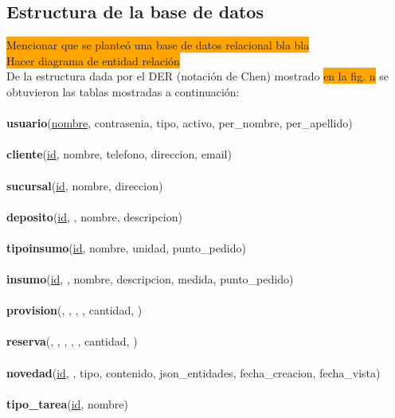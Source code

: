 \documentclass[a4paper, 12pt,twoside]{report}  %
\numberwithin{equation}{subsection} %
\begin{document}
\subsection{Estructura de la base de datos}
\colorbox{orange}{Mencionar que se planteó una base de datos relacional bla bla}\\
\colorbox{orange}{Hacer diagrama de entidad relación}\\
De la estructura dada por el DER (notación de Chen) mostrado \colorbox{orange}{en la fig. n} se obtuvieron las tablas mostradas a continuación:
\\\\
\noindent\textbf{usuario}(\underline{nombre}, contrasenia, tipo, activo, per\_nombre, per\_apellido)
\\\\
\textbf{cliente}(\underline{id}, nombre, telefono, direccion, email)
\\\\
\textbf{sucursal}(\underline{id}, nombre, direccion)
\\\\
\textbf{deposito}(\underline{id}, \underline{}, nombre, descripcion)
\\\\
\textbf{tipo\-insumo}(\underline{id}, nombre, unidad, punto\_pedido)
\\\\
\textbf{insumo}(\underline{id}, \underline{}, nombre, descripcion, medida, punto\_pedido)
\\\\
\textbf{provision}(\underline{}, \underline{}, \underline{}, \underline{}, cantidad, \underline{})
\\\\
\textbf{reserva}(\underline{}, \underline{}, \underline{}, \underline{}, \underline{}, cantidad, \underline{})
\\\\
\textbf{novedad}(\underline{id}, , tipo, contenido, json\_entidades, fecha\_creacion, fecha\_vista)
\\\\
\textbf{tipo\_tarea}(\underline{id}, nombre)
\\\\
\end{document}
